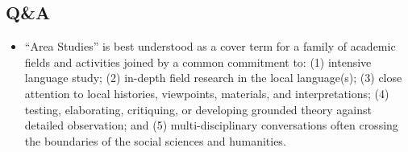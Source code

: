 \documentclass[emulatestandardclasses]{scrartcl}
\begin{document}
\subsection{Q\&A}

\begin{itemize}
  \item "`Area Studies"' is best understood as a cover term for a family of academic fields and activities joined by a common commitment to: (1) intensive language study; (2) in-depth field research in the local language(s); (3) close attention to local histories, viewpoints, materials, and interpretations; (4) testing, elaborating, critiquing, or developing grounded theory against detailed observation; and (5) multi-disciplinary conversations often crossing the boundaries of the social sciences and humanities.
\end{itemize}

\newpage
\end{document}
